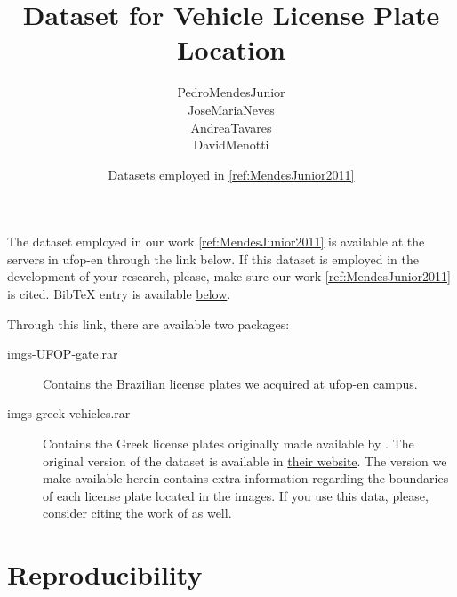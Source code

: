 

% 

\renewcommand\highlightauthorname[1]{#1}

\title{Dataset for Vehicle License Plate Location}
\author{\gls{PedroMendesJunior}\\%
  \gls{JoseMariaNeves}\\%
  \gls{AndreaTavares}\\%
  \gls{DavidMenotti}\\%
}
\date{Datasets employed in \ref{ref:MendesJunior2011}}




\maketitle

The dataset employed in our work \ref{ref:MendesJunior2011} is available at the servers in \gls{ufop-en} through the link below.
If this dataset is employed in the development of your research, please, make sure our work \ref{ref:MendesJunior2011} is cited.
BibTeX entry is available \hyperref[ref:MendesJunior2011]{below}.

\begin{center}
\end{center}

Through this link, there are available two packages:

\begin{description}
\item[imgs-UFOP-gate.rar]
  Contains the Brazilian license plates we acquired at \gls{ufop-en} campus.
\item[imgs-greek-vehicles.rar]
  Contains the Greek license plates originally made available by .
  The original version of the dataset is available in \href{http://www.medialab.ntua.gr/research/LPRdatabase.html}{their website}.
  The version we make available herein contains extra information regarding the boundaries of each license plate located in the images.
  If you use this data, please, consider citing the work of  as well.
\end{description}

\section*{Reproducibility}
\label{sec:reproducibility}

